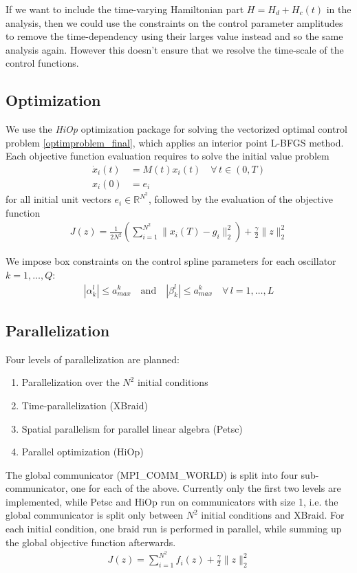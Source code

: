 \documentclass[letterpaper]{article}
\newcommand{\R}{\mathds{R}}
\begin{document}
       If we want to include the time-varying Hamiltonian part $H = H_d + H_c(t)$ in the analysis, then we could use the constraints on the control parameter amplitudes to remove the time-dependency using their larges value instead and so the same analysis again. However this doesn't ensure that we resolve the time-scale of the control functions. 

  \subsection{Optimization}
    We use the \textit{HiOp} optimization package for solving the vectorized optimal control problem \eqref{optimproblem_final}, which applies an interior point L-BFGS method. Each objective function evaluation requires to solve the initial value problem  
        \begin{align*}
          \dot x_i(t) &= M(t) x_i(t) \quad \forall \, t\in (0,T) \\
          x_i(0) &= e_i
        \end{align*}
        for all initial unit vectors $e_i \in \R^{N^2}$, followed by the evaluation of the objective function 
        \begin{align}
          J(z) = \frac{1}{2N^2} \left(\sum_{i=1}^{N^2} \|x_i(T) - g_i\|^2_2  \right) + \frac{\gamma}{2} \| z\|^2_2
        \end{align}

    We impose box constraints on the control spline parameters for each oscillator $k=1,\dots, Q$:
        \begin{align}
          | \alpha^l_k| \leq a_{max}^k \quad \text{and} \quad | \beta^l_k|  \leq a_{max}^k \quad \forall \, l=1,\dots, L 
        \end{align}


  \subsection{Parallelization}
    Four levels of parallelization are planned: 
      \begin{enumerate}
        \item Parallelization over the $N^2$ initial conditions
        \item Time-parallelization (XBraid)
        \item Spatial parallelism for parallel linear algebra (Petsc)
        \item Parallel optimization (HiOp)
      \end{enumerate}
      The global communicator (MPI\_COMM\_WORLD) is split into four sub-communicator, one for each of the above. Currently only the first two levels are implemented, while Petsc and HiOp run on communicators with size 1, i.e. the global communicator is split only between $N^2$ initial conditions and XBraid. For each initial condition, one braid run is performed in parallel, while summing up the global objective function afterwards.
      \begin{align*}
        J(z) = \sum_{i=1}^{N^2} f_i(z) + \frac{\gamma}{2}\| z\|^2_2
      \end{align*}
      
\end{document}
